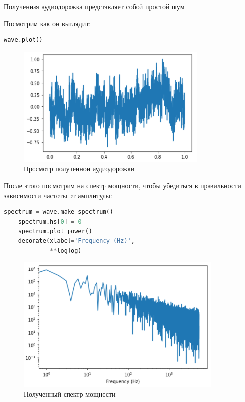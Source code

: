 \documentclass[a4paper]{article}
\begin{document}
            Полученная аудиодорожка представляет собой простой шум
            
            Посмотрим как он выглядит:
            
\begin{lstlisting}[language=Python, caption= Просмотр полученной аудиодорожки]
   wave.plot()
\end{lstlisting}               
            
            \begin{figure}[H]
                \centering
                \includegraphics{ex_5_wave_plot.png}
                \caption{Просмотр полученной аудиодорожки}
                \label{fig:ex_5_wave_plot}
            \end{figure}
            
            После этого посмотрим на спектр мощности, чтобы убедиться в правильности зависимости частоты от амплитуды:
            
\begin{lstlisting}[language=Python, caption= Получения спектра мощности]
  spectrum = wave.make_spectrum()
    spectrum.hs[0] = 0
    spectrum.plot_power()
    decorate(xlabel='Frequency (Hz)',
             **loglog)
\end{lstlisting}               
            
            \begin{figure}[H]
                \centering
                \includegraphics{ex_5_wave_spectr.png}
                \caption{Полученный спектр мощности}
                \label{fig:ex_5_wave_spectr}
            \end{figure}
            
\end{document}

